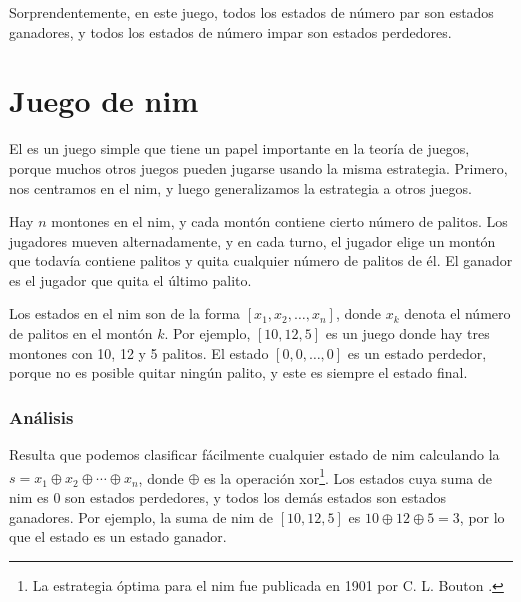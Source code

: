 \begin{center}
\end{center}

Sorprendentemente, en este juego,
todos los estados de número par son estados ganadores,
y todos los estados de número impar son estados perdedores.

\section{Juego de nim}


El  es un juego simple que
tiene un papel importante en la teoría de juegos,
porque muchos otros juegos pueden jugarse usando
la misma estrategia.
Primero, nos centramos en el nim,
y luego generalizamos la estrategia
a otros juegos.

Hay $n$ montones en el nim,
y cada montón contiene cierto número de palitos.
Los jugadores mueven alternadamente,
y en cada turno, el jugador elige
un montón que todavía contiene palitos
y quita cualquier número de palitos de él.
El ganador es el jugador que quita el último palito.

Los estados en el nim son de la forma
$[x_1,x_2,\ldots,x_n]$,
donde $x_k$ denota el número de palitos en el montón $k$.
Por ejemplo, $[10,12,5]$ es un juego donde
hay tres montones con 10, 12 y 5 palitos.
El estado $[0,0,\ldots,0]$ es un estado perdedor,
porque no es posible quitar ningún palito,
y este es siempre el estado final.

\subsubsection{Análisis}

Resulta que podemos clasificar fácilmente
cualquier estado de nim calculando
la  $s = x_1 \oplus x_2 \oplus \cdots \oplus x_n$,
donde $\oplus$ es la operación xor\footnote{La estrategia óptima
para el nim fue publicada en 1901 por C. L. Bouton \cite{bou01}.}.
Los estados cuya suma de nim es 0 son estados perdedores,
y todos los demás estados son estados ganadores.
Por ejemplo, la suma de nim de
$[10,12,5]$ es $10 \oplus 12 \oplus 5 = 3$,
por lo que el estado es un estado ganador.

